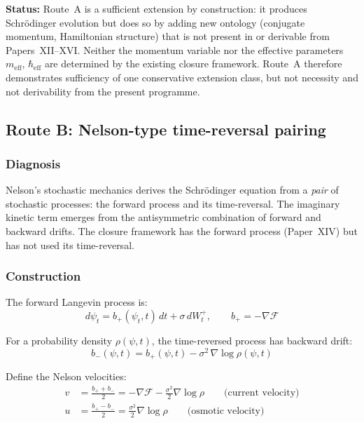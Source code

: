 \documentclass[12pt]{article}
\newcommand{\Fcal}{\mathcal{F}}
\begin{document}
\textbf{Status:} Route~A is a sufficient extension by construction: it produces Schr\"odinger evolution but does so by adding new ontology (conjugate momentum, Hamiltonian structure) that is not present in or derivable from Papers~XII--XVI. Neither the momentum variable nor the effective parameters $m_{\mathrm{eff}}$, $\hbar_{\mathrm{eff}}$ are determined by the existing closure framework. Route~A therefore demonstrates sufficiency of one conservative extension class, but not necessity and not derivability from the present programme.

\subsection{Route B: Nelson-type time-reversal pairing}\label{sec:routeB}

\subsubsection*{Diagnosis}

Nelson's stochastic mechanics derives the Schr\"odinger equation from a \textit{pair} of stochastic processes: the forward process and its time-reversal. The imaginary kinetic term emerges from the antisymmetric combination of forward and backward drifts. The closure framework has the forward process (Paper~XIV) but has not used its time-reversal.

\subsubsection*{Construction}

The forward Langevin process is:
\begin{equation}
    d\psi_t = b_+(\psi_t, t)\, dt + \sigma\, dW_t^+, \qquad b_+ = -\nabla\Fcal
\end{equation}

For a probability density $\rho(\psi, t)$, the time-reversed process has backward drift:
\begin{equation}\label{eq:backward}
    b_-(\psi, t) = b_+(\psi, t) - \sigma^2\, \nabla\log\rho(\psi, t)
\end{equation}

Define the Nelson velocities:
\begin{align}
    v &= \frac{b_+ + b_-}{2} = -\nabla\Fcal - \frac{\sigma^2}{2}\nabla\log\rho \qquad \text{(current velocity)} \label{eq:current} \\
    u &= \frac{b_+ - b_-}{2} = \frac{\sigma^2}{2}\nabla\log\rho \qquad \text{(osmotic velocity)} \label{eq:osmotic}
\end{align}
\end{document}

